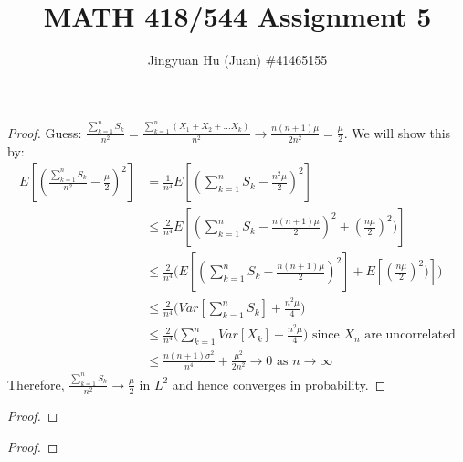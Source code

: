 \documentclass[10pt]{article}
\newenvironment{problem}[2][Problem]{\begin{trivlist}
\item[\hskip \labelsep {\bfseries #1}\hskip \labelsep {\bfseries #2.}]}{\end{trivlist}}
\begin{document}
 
\title{\vspace{-1.6cm}\large MATH 418/544 Assignment 5}
\author{\large Jingyuan Hu (Juan) \#41465155}
\date{}
\maketitle
 
\begin{problem}{1}
\end{problem}
 
\begin{proof}
Guess: $\frac{\sum_{k=1}^{n}S_{k}}{n^2} = \frac{\sum_{k=1}^{n}(X_{1}+X_{2}+...X_{k})}{n^2} \rightarrow  \frac{n(n+1)\mu}{2n^2} = \frac{\mu}{2}$. We will show this by:
\begin{equation}
\begin{split}
E[(\frac{\sum_{k=1}^{n}S_{k}}{n^2} - \frac{\mu}{2})^2] &= \frac{1}{n^4}E[(\sum_{k=1}^{n}S_{k} - \frac{n^2\mu}{2})^2]\\
&\le \frac{2}{n^4}E[(\sum_{k=1}^{n}S_{k} - \frac{n(n+1)\mu}{2})^2 + (\frac{n\mu}{2})^2)]\\
&\le \frac{2}{n^4}\big(E[(\sum_{k=1}^{n}S_{k} - \frac{n(n+1)\mu}{2})^2] + E[(\frac{n\mu}{2})^2)]\big)\\
&\le \frac{2}{n^4}\big(Var[\sum_{k=1}^{n}S_{k}] + \frac{n^2\mu}{4}\big)\\
&\le \frac{2}{n^4}\big(\sum_{k=1}^{n} Var[X_{k}] + \frac{n^2\mu}{4}\big) \text{ since } X_{n} \text { are uncorrelated}\\
&\le \frac{n(n+1)\sigma^2}{n^4}+ \frac{\mu^2}{2n^2} \rightarrow 0 \text{ as } n\rightarrow \infty
\end{split}
\end{equation}
Therefore, $\frac{\sum_{k=1}^{n}S_{k}}{n^2} \rightarrow \frac{\mu}{2}$ in $L^2$ and hence converges in probability.
\end{proof}

\begin{problem}{2(c)}
\end{problem}
\begin{proof}

\end{proof}



\begin{problem}{1(a)}
\end{problem}
\begin{proof}

\end{proof}
\end{document}
